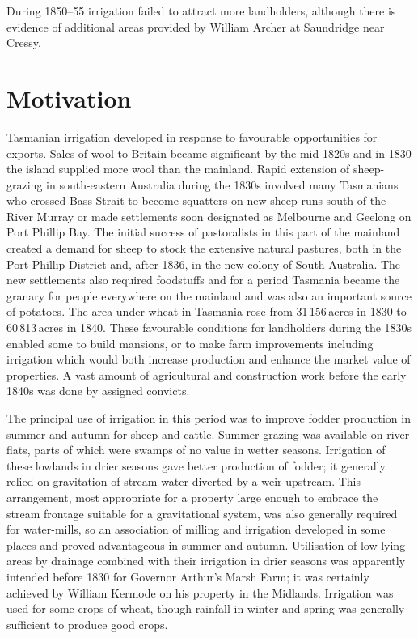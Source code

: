 During 1850--55 irrigation failed to attract more landholders,
although there is evidence of additional areas provided by William
Archer at Saundridge near
Cressy.

\section*{Motivation}

Tasmanian irrigation developed in response to favourable opportunities
for exports.  Sales of wool to Britain became significant
by the mid 1820s and in 1830 the island supplied more wool than the
mainland.  Rapid extension of sheep-grazing in south-eastern Australia
during the 1830s involved many Tasmanians who crossed Bass Strait to
become squatters on new sheep runs south of the River
Murray or made settlements soon designated as
Melbourne and Geelong on
Port Phillip Bay. The initial success of
pastoralists in this part of the mainland created a demand for sheep
to stock the extensive natural pastures, both in the Port Phillip
District and, after 1836, in the new colony of South
Australia. The new settlements also required
foodstuffs and for a period Tasmania became the granary for people
everywhere on the mainland and was also an important source of
potatoes.  The area under wheat in Tasmania rose from 31\,156\,acres
in 1830 to 60\,813\,acres in 1840.  These favourable conditions for
landholders during the 1830s enabled some to build mansions, or to
make farm improvements including irrigation which would both increase
production and enhance the market value of properties.  A vast amount
of agricultural and construction work before the early 1840s was done
by assigned convicts.

The principal use of irrigation in this period was to improve fodder
production in summer and autumn for sheep and cattle. Summer grazing
was available on river flats, parts of which were swamps of no value
in wetter seasons.  Irrigation of these lowlands in drier seasons gave
better production of fodder; it generally relied on gravitation of
stream water diverted by a weir upstream.  This arrangement, most
appropriate for a property large enough to embrace the stream frontage
suitable for a gravitational system, was also generally required for
water-mills, so an association of milling and irrigation developed in
some places and proved advantageous in summer and autumn.  Utilisation
of low-lying areas by drainage combined with their irrigation in drier
seasons was apparently intended before 1830 for Governor Arthur's
Marsh Farm; it was certainly achieved by William Kermode on his
property in the Midlands.  Irrigation was used for some crops of
wheat, though rainfall in winter and spring was generally sufficient
to produce good crops.

